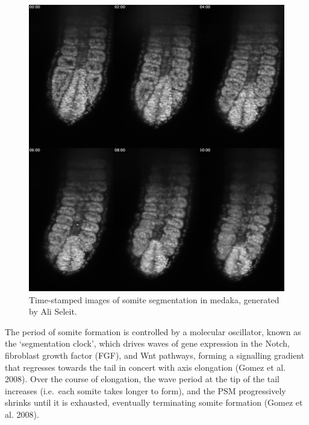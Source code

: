 \documentclass[
]{book}
\begin{document}
\begin{figure}
\includegraphics[width=1\linewidth]{figs/somites/ali_fish_seg_compiled} \caption{Time-stamped images of somite segmentation in medaka, generated by Ali Seleit.}\label{fig:somite-seg-ali}
\end{figure}

The period of somite formation is controlled by a molecular oscillator, known as the `segmentation clock', which drives waves of gene expression in the Notch, fibroblast growth factor (FGF), and Wnt pathways, forming a signalling gradient that regresses towards the tail in concert with axis elongation (Gomez et al. 2008). Over the course of elongation, the wave period at the tip of the tail increases (i.e.~each somite takes longer to form), and the PSM progressively shrinks until it is exhausted, eventually terminating somite formation (Gomez et al. 2008).
\end{document}
